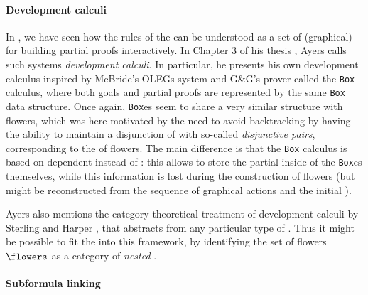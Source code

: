 \begin{scope}
\paragraph{Development calculi}

In , we have seen how the rules of the  can be understood as a set of (graphical)  for building
partial proofs interactively. In Chapter 3 of his thesis
, Ayers calls such systems \emph{development calculi}. In
particular, he presents his own development calculus inspired by McBride's OLEGs
system  and G\&G's prover
 called the \texttt{Box} calculus, where both
goals and partial proofs are represented by the same \texttt{Box} data
structure. Once again, \texttt{Box}es seem to share a very similar structure
with flowers, which was here motivated by the need to avoid backtracking by
having the ability to maintain a disjunction of  with so-called
\emph{disjunctive pairs}, corresponding to the  of flowers. The main
difference is that the \texttt{Box} calculus is based on dependent  instead of : this allows to store the partial
 inside of the \texttt{Box}es themselves, while this information
is lost during the construction of flowers (but might be reconstructed from the
sequence of graphical actions and the initial ).

Ayers also mentions the category-theoretical treatment of development calculi by
Sterling and Harper , that abstracts from any
particular type of . Thus it might be possible to fit the  into this framework, by identifying the set of flowers $\flowers$ as a
category of \emph{nested }.

\paragraph{Subformula linking}


\end{scope}
